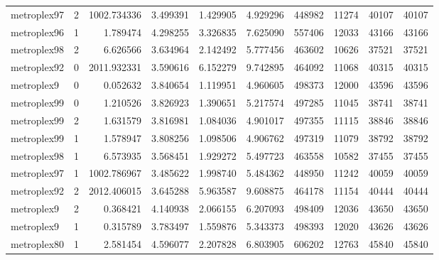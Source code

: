 \begin{longtable}{|l|r|r|r|r|r|r|r|r|r|}
metroplex97 & 2 & 1002.734336 & 3.499391 & 1.429905 & 4.929296 & 448982 & 11274 & 40107 & 40107 \\
metroplex96 & 1 & 1.789474 & 4.298255 & 3.326835 & 7.625090 & 557406 & 12033 & 43166 & 43166 \\
metroplex98 & 2 & 6.626566 & 3.634964 & 2.142492 & 5.777456 & 463602 & 10626 & 37521 & 37521 \\
metroplex92 & 0 & 2011.932331 & 3.590616 & 6.152279 & 9.742895 & 464092 & 11068 & 40315 & 40315 \\
metroplex9 & 0 & 0.052632 & 3.840654 & 1.119951 & 4.960605 & 498373 & 12000 & 43596 & 43596 \\
metroplex99 & 0 & 1.210526 & 3.826923 & 1.390651 & 5.217574 & 497285 & 11045 & 38741 & 38741 \\
metroplex99 & 2 & 1.631579 & 3.816981 & 1.084036 & 4.901017 & 497355 & 11115 & 38846 & 38846 \\
metroplex99 & 1 & 1.578947 & 3.808256 & 1.098506 & 4.906762 & 497319 & 11079 & 38792 & 38792 \\
metroplex98 & 1 & 6.573935 & 3.568451 & 1.929272 & 5.497723 & 463558 & 10582 & 37455 & 37455 \\
metroplex97 & 1 & 1002.786967 & 3.485622 & 1.998740 & 5.484362 & 448950 & 11242 & 40059 & 40059 \\
metroplex92 & 2 & 2012.406015 & 3.645288 & 5.963587 & 9.608875 & 464178 & 11154 & 40444 & 40444 \\
metroplex9 & 2 & 0.368421 & 4.140938 & 2.066155 & 6.207093 & 498409 & 12036 & 43650 & 43650 \\
metroplex9 & 1 & 0.315789 & 3.783497 & 1.559876 & 5.343373 & 498393 & 12020 & 43626 & 43626 \\
metroplex80 & 1 & 2.581454 & 4.596077 & 2.207828 & 6.803905 & 606202 & 12763 & 45840 & 45840 \\
\end{longtable}
